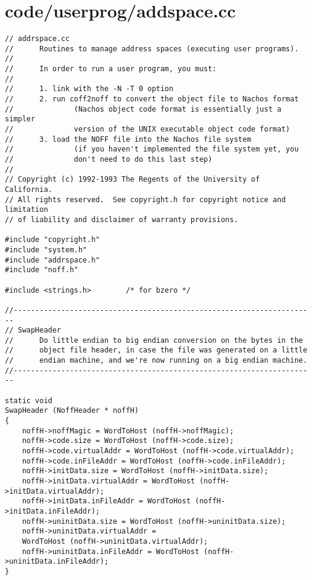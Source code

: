 \documentclass[a4paper,10pt]{article}
\begin{document}
\section{code/userprog/addspace.cc}
\begin{lstlisting}
// addrspace.cc
//      Routines to manage address spaces (executing user programs).
//
//      In order to run a user program, you must:
//
//      1. link with the -N -T 0 option
//      2. run coff2noff to convert the object file to Nachos format
//              (Nachos object code format is essentially just a simpler
//              version of the UNIX executable object code format)
//      3. load the NOFF file into the Nachos file system
//              (if you haven't implemented the file system yet, you
//              don't need to do this last step)
//
// Copyright (c) 1992-1993 The Regents of the University of California.
// All rights reserved.  See copyright.h for copyright notice and limitation
// of liability and disclaimer of warranty provisions.

#include "copyright.h"
#include "system.h"
#include "addrspace.h"
#include "noff.h"

#include <strings.h>        /* for bzero */

//----------------------------------------------------------------------
// SwapHeader
//      Do little endian to big endian conversion on the bytes in the
//      object file header, in case the file was generated on a little
//      endian machine, and we're now running on a big endian machine.
//----------------------------------------------------------------------

static void
SwapHeader (NoffHeader * noffH)
{
    noffH->noffMagic = WordToHost (noffH->noffMagic);
    noffH->code.size = WordToHost (noffH->code.size);
    noffH->code.virtualAddr = WordToHost (noffH->code.virtualAddr);
    noffH->code.inFileAddr = WordToHost (noffH->code.inFileAddr);
    noffH->initData.size = WordToHost (noffH->initData.size);
    noffH->initData.virtualAddr = WordToHost (noffH->initData.virtualAddr);
    noffH->initData.inFileAddr = WordToHost (noffH->initData.inFileAddr);
    noffH->uninitData.size = WordToHost (noffH->uninitData.size);
    noffH->uninitData.virtualAddr =
    WordToHost (noffH->uninitData.virtualAddr);
    noffH->uninitData.inFileAddr = WordToHost (noffH->uninitData.inFileAddr);
}



\end{lstlisting}
\end{document}
